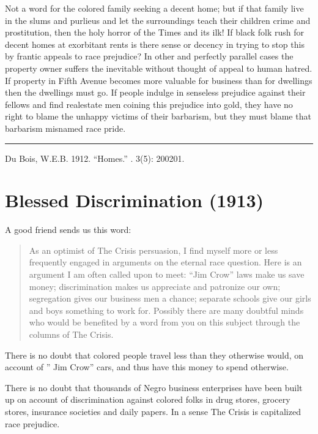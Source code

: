 \documentclass[letterpaper,10pt,english]{jupyterBook}
\begin{document}
\sphinxAtStartPar
Not a word for the colored family seeking a decent home; but if that family live in the slums and purlieus and let the surroundings teach their children crime and prostitution, then the holy horror of the Times and its ilk! If black folk rush for decent homes at exorbitant rents is there sense or decency in trying to stop this by frantic appeals to race prejudice? In other and perfectly parallel cases the property owner suffers the inevi­table without thought of appeal to human hatred. If property in Fifth Avenue becomes more valuable for business than for dwellings then the dwellings must go. If people indulge in senseless prejudice against their fellows and find real\sphinxhyphen{}estate men coining this prejudice into gold, they have no right to blame the unhappy victims of their barbarism, but they must blame that barbarism misnamed race pride.


\bigskip\hrule\bigskip


\sphinxAtStartPar
{} Du Bois, W.E.B. 1912. “Homes.”  . 3(5): 200\sphinxhyphen{}201.


\section{Blessed Discrimination (1913)}
\label{\detokenize{Volumes/05/04/blesseddiscrimination:blessed-discrimination-1913}}\label{\detokenize{Volumes/05/04/blesseddiscrimination::doc}}
\sphinxAtStartPar
A good friend sends us this word:
\begin{quote}

\sphinxAtStartPar
As an optimist of The Crisis persuasion, I find myself more or less frequently engaged in arguments on the eternal race question. Here is an argument I am often called upon to meet: “Jim Crow” laws make us save money; discrimination makes us appreciate and patronize our own; segregation gives our business men a chance; separate schools give our girls and boys something to work for. Possibly there are many doubtful minds who would be benefited by a word from you on this subject through the columns of The Crisis.
\end{quote}

\sphinxAtStartPar
There is no doubt that colored people travel less than they otherwise would, on account of ” Jim Crow” cars, and thus have this money to spend otherwise.

\sphinxAtStartPar
There is no doubt that thousands of Negro business enterprises have been built up on account of discrimination against colored folks in drug stores, grocery stores, insurance societies and daily papers. In a sense The Crisis is capitalized race prejudice.
\end{document}
